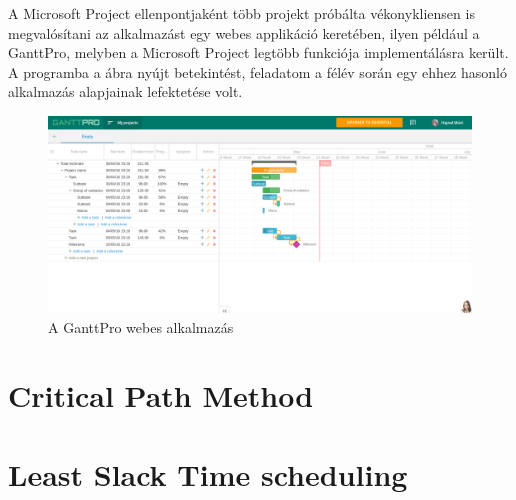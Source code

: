 A Microsoft Project ellenpontjaként több projekt próbálta vékonykliensen is megvalósítani az alkalmazást egy webes applikáció keretében, ilyen például a GanttPro, melyben a Microsoft Project legtöbb funkciója implementálásra került. A programba a  ábra nyújt betekintést, feladatom a félév során egy ehhez hasonló alkalmazás alapjainak lefektetése volt.

\begin{figure}[!ht]
\centering
\includegraphics[width=\textwidth, keepaspectratio]{figures/ganntpro.png}
\caption{A GanttPro webes alkalmazás} 
\label{fig:GanttPro}
\end{figure} 

\section{Critical Path Method}


\section{Least Slack Time scheduling}
